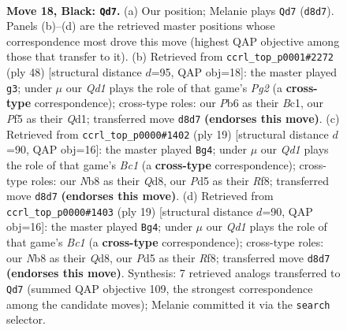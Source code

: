 \documentclass[11pt]{article}
\begin{document}
\clearpage

\begin{figure}[p]\centering
\begin{subfigure}{0.46\textwidth}\centering
\resizebox{\linewidth}{!}{%
\newchessgame
\chessboard[
  setfen={rnbq1rk1/p3b2p/1pp3pP/3p1pP1/P2P1P2/1P2P3/4N3/R2QKBNR b KQ - 6 18},
  showmover=false,
  pgfstyle=straightmove, color=movearrow, markmove={d8-d7}
]}
\caption{}
\end{subfigure}\hfill
\begin{subfigure}{0.46\textwidth}\centering
\resizebox{\linewidth}{!}{%
\newchessgame
\chessboard[
  setfen={r2q3k/1pb2rnp/2p2np1/p1Pp1p2/P2P1N2/5R2/1PB2PPP/2BQR1K1 w - - 2 25},
  showmover=false,
  pgfstyle=straightmove, color=movearrow, markmove={g2-g3}
]}
\caption{}
\end{subfigure}
\\[4pt]
\begin{subfigure}{0.46\textwidth}\centering
\resizebox{\linewidth}{!}{%
\newchessgame
\chessboard[
  setfen={r1bq1rk1/4ppbp/2pp1np1/p1p5/P4P2/1P1PPN2/1BP3PP/RN1Q1RK1 b - - 0 10},
  showmover=false,
  pgfstyle=straightmove, color=movearrow, markmove={c8-g4}
]}
\caption{}
\end{subfigure}\hfill
\begin{subfigure}{0.46\textwidth}\centering
\resizebox{\linewidth}{!}{%
\newchessgame
\chessboard[
  setfen={r1bq1rk1/4ppbp/2pp1np1/p1p5/P4P2/1P1PPN2/1BP3PP/RN1Q1RK1 b - - 0 10},
  showmover=false,
  pgfstyle=straightmove, color=movearrow, markmove={c8-g4}
]}
\caption{}
\end{subfigure}
\caption{\textbf{Move 18, Black: \texttt{Qd7}.} (a) Our position; Melanie plays \texttt{Qd7} (\texttt{d8d7}). Panels (b)--(d) are the retrieved master positions whose correspondence most drove this move (highest QAP objective among those that transfer to it). (b) Retrieved from \texttt{ccrl\_top\_p0001\#2272} (ply 48) [structural distance $d$=95, QAP obj=18]: the master played \texttt{g3}; under $\mu$ our \emph{Qd1} plays the role of that game's \emph{Pg2} (a \textbf{cross-type} correspondence); cross-type roles: our \emph{P}b6 as their \emph{B}c1, our \emph{P}f5 as their \emph{Q}d1; transferred move \texttt{d8d7} \textbf{(endorses this move)}. (c) Retrieved from \texttt{ccrl\_top\_p0000\#1402} (ply 19) [structural distance $d$=90, QAP obj=16]: the master played \texttt{Bg4}; under $\mu$ our \emph{Qd1} plays the role of that game's \emph{Bc1} (a \textbf{cross-type} correspondence); cross-type roles: our \emph{N}b8 as their \emph{Q}d8, our \emph{P}d5 as their \emph{R}f8; transferred move \texttt{d8d7} \textbf{(endorses this move)}. (d) Retrieved from \texttt{ccrl\_top\_p0000\#1403} (ply 19) [structural distance $d$=90, QAP obj=16]: the master played \texttt{Bg4}; under $\mu$ our \emph{Qd1} plays the role of that game's \emph{Bc1} (a \textbf{cross-type} correspondence); cross-type roles: our \emph{N}b8 as their \emph{Q}d8, our \emph{P}d5 as their \emph{R}f8; transferred move \texttt{d8d7} \textbf{(endorses this move)}. Synthesis: 7 retrieved analogs transferred to \texttt{Qd7} (summed QAP objective 109, the strongest correspondence among the candidate moves); Melanie committed it via the \texttt{search} selector.}

\end{figure}
\end{document}
